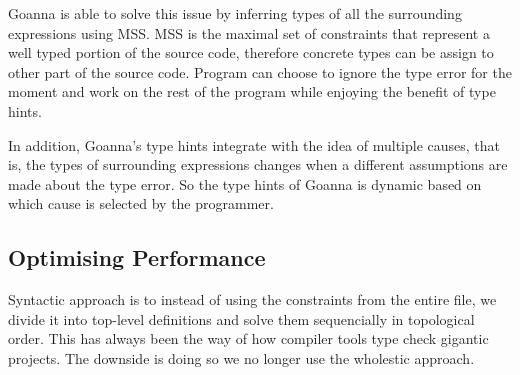 \documentclass[pdflatex,sn-mathphys-num]{sn-jnl}%
\begin{document}
    Goanna is able to solve this issue by inferring types of all the surrounding expressions using MSS. MSS is the maximal set of constraints that represent a well typed portion of the source code, therefore concrete types can be assign to other part of the source code. Program can choose to ignore the type error for the moment and work on the rest of the program while enjoying the benefit of type hints.

    In addition, Goanna's type hints integrate with the idea of multiple causes, that is, the types of surrounding expressions changes when a different assumptions are made about the type error. So the type hints of Goanna is dynamic based on which cause is selected by the programmer.



 




    
    
    \subsection{Optimising Performance}
    Syntactic approach is to instead of using the constraints from the entire file, we divide it into top-level definitions and solve them sequencially in topological order. This has always been the way of how compiler tools type check gigantic projects. The downside is doing so we no longer use the  wholestic approach.
\end{document}
